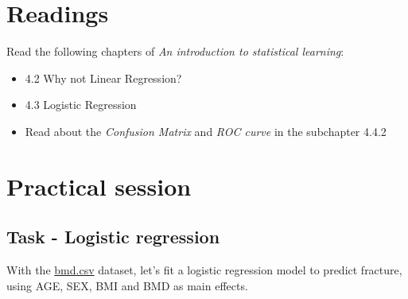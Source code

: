 \documentclass[
]{book}
\newenvironment{Shaded}{\begin{snugshade}}{\end{snugshade}}
\newcommand{\AttributeTok}[1]{\textcolor[rgb]{0.13,0.29,0.53}{#1}}
\newcommand{\CommentTok}[1]{\textcolor[rgb]{0.56,0.35,0.01}{\textit{#1}}}
\newcommand{\ConstantTok}[1]{\textcolor[rgb]{0.56,0.35,0.01}{#1}}
\newcommand{\DecValTok}[1]{\textcolor[rgb]{0.00,0.00,0.81}{#1}}
\newcommand{\FunctionTok}[1]{\textcolor[rgb]{0.13,0.29,0.53}{\textbf{#1}}}
\newcommand{\NormalTok}[1]{#1}
\newcommand{\OtherTok}[1]{\textcolor[rgb]{0.56,0.35,0.01}{#1}}
\newcommand{\SpecialCharTok}[1]{\textcolor[rgb]{0.81,0.36,0.00}{\textbf{#1}}}
\newcommand{\StringTok}[1]{\textcolor[rgb]{0.31,0.60,0.02}{#1}}
\providecommand{\tightlist}{%
  \setlength{\itemsep}{0pt}\setlength{\parskip}{0pt}}
\begin{document}
\section{Readings}\label{lr.read}

Read the following chapters of \emph{An introduction to statistical learning}:

\begin{itemize}
\tightlist
\item
  4.2 Why not Linear Regression?
\item
  4.3 Logistic Regression
\item
  Read about the \emph{Confusion Matrix} and \emph{ROC curve} in the
  subchapter 4.4.2
\end{itemize}

\section{Practical session}\label{lr.prac}

\subsection*{Task - Logistic regression}\label{task---logistic-regression}

With the \href{https://www.dropbox.com/s/7wjsfdaf0wt2kg2/bmd.csv?dl=1}{bmd.csv}
dataset, let's fit a logistic regression model to predict fracture, using AGE,
SEX, BMI and BMD as main effects.

\begin{Shaded}
\end{Shaded}
\end{document}
